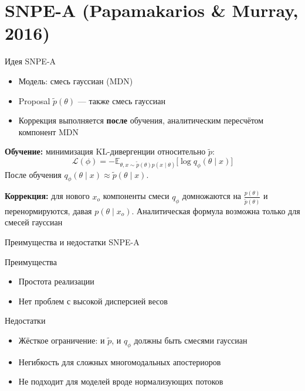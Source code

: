 \documentclass[10pt,aspectratio=169]{beamer}
\begin{document}
\section{SNPE-A (Papamakarios \& Murray, 2016)}

\begin{frame}{Идея SNPE-A}
    \begin{itemize}
        \item Модель: смесь гауссиан (MDN)
        \item Proposal $\tilde{p}(\theta)$ — также смесь гауссиан
        \item Коррекция выполняется \textbf{после} обучения, аналитическим пересчётом компонент MDN
    \end{itemize}
    \pause
    \textbf{Обучение:} минимизация KL-дивергенции относительно $\tilde{p}$:
    \[
    \mathcal{L}(\phi) = -\mathbb{E}_{\theta,x\sim\tilde{p}(\theta)p(x\mid\theta)}\bigl[\log q_\phi(\theta\mid x)\bigr]
    \]
    После обучения $q_\phi(\theta\mid x) \approx \tilde{p}(\theta\mid x)$.
    \pause
    
    \textbf{Коррекция:} для нового $x_o$ компоненты смеси $q_\phi$ домножаются на $\frac{p(\theta)}{\tilde{p}(\theta)}$ и перенормируются, давая $p(\theta\mid x_o)$. Аналитическая формула возможна только для смесей гауссиан
\end{frame}

\begin{frame}{Преимущества и недостатки SNPE-A}
    \begin{block}{Преимущества}
        \begin{itemize}
            \item Простота реализации
            \item Нет проблем с высокой дисперсией весов
        \end{itemize}
    \end{block}
    \pause
    \begin{block}{Недостатки}
        \begin{itemize}
            \item Жёсткое ограничение: и $\tilde{p}$, и $q_\phi$ должны быть смесями гауссиан
            \item Негибкость для сложных многомодальных апостериоров
            \item Не подходит для моделей вроде нормализующих потоков
        \end{itemize}
    \end{block}
\end{frame}
\end{document}
